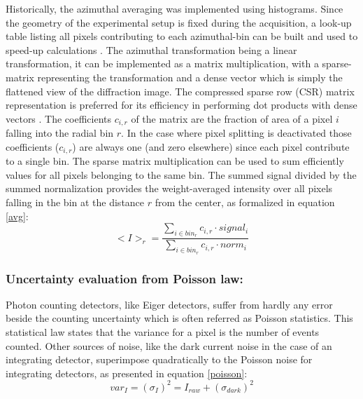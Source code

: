 \documentclass[a4paper,12pt,oneside]{article}              %
\begin{document}
Historically, the azimuthal averaging was implemented using histograms. 
Since the geometry of the experimental setup is fixed during the acquisition, a look-up table listing all pixels contributing to each  azimuthal-bin can be built and used to speed-up calculations \cite{pyFAI_gpu}.
The azimuthal transformation being a linear transformation, it can be implemented as a matrix multiplication, with a sparse-matrix representing the transformation and a dense vector which is simply the flattened view of the diffraction image. 
The compressed sparse row (CSR) matrix representation is preferred for its efficiency in performing dot products with dense vectors \cite{SpMV}.
The coefficients $c_{i,r}$ of the matrix are the fraction of area of a pixel $i$ falling into the radial bin $r$.
In the case where pixel splitting is deactivated those coefficients  ($c_{i,r}$) are always one (and zero elsewhere) since each pixel contribute to a single bin.
The sparse matrix multiplication can be used to sum efficiently values for all pixels belonging to the same bin.
The summed signal divided by the summed normalization provides the weight-averaged intensity over all pixels falling in the bin at the distance $r$ from the center, as formalized in equation \ref{avg}: 
\begin{equation}
\label{avg}
<I>_{r} = \frac{\sum\limits_{i \in bin_r} c_{i,r} \cdot signal_i}
                        {\sum\limits_{i \in bin_r} c_{i,r} \cdot norm_i} 
\end{equation}  

\subsubsection{Uncertainty evaluation from Poisson law:}
Photon counting detectors, like Eiger detectors, suffer from hardly any error beside the counting uncertainty which is often referred as Poisson statistics.
This statistical law states that the variance for a pixel is the number of events counted.
Other sources of noise, like the dark current noise in the case of an integrating detector,  superimpose quadratically to the Poisson noise for integrating detectors, as presented in equation \ref{poisson}:     
\begin{equation}
\label{poisson}
var_I = (\sigma_I)^{2} = I_{raw} + (\sigma_{dark})^{2}  
\end{equation}
\end{document}
